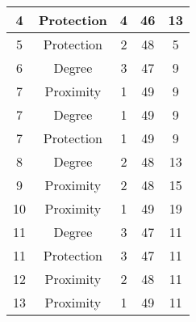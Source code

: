 \documentclass[results.tex]{subfiles}
\begin{document}
\begin{center}
\begin{tabular}{| c || c | c | c | c |}
            \hline
            4                       & Protection                   & 4                      & 46                      & 13                   \\
            \hline
            5                       & Protection                   & 2                      & 48                      & 5                    \\
            \hline
            6                       & Degree                       & 3                      & 47                      & 9                    \\
            \hline
            7                       & Proximity                    & 1                      & 49                      & 9                    \\
            \hline
            7                       & Degree                       & 1                      & 49                      & 9                    \\
            \hline
            7                       & Protection                   & 1                      & 49                      & 9                    \\
            \hline
            8                       & Degree                       & 2                      & 48                      & 13                   \\
            \hline
            9                       & Proximity                    & 2                      & 48                      & 15                   \\
            \hline
            10                      & Proximity                    & 1                      & 49                      & 19                   \\
            \hline
            11                      & Degree                       & 3                      & 47                      & 11                   \\
            \hline
            11                      & Protection                   & 3                      & 47                      & 11                   \\
            \hline
            12                      & Proximity                    & 2                      & 48                      & 11                   \\
            \hline
            13                      & Proximity                    & 1                      & 49                      & 11                   \\

\end{tabular}
\end{center}
\end{document}
